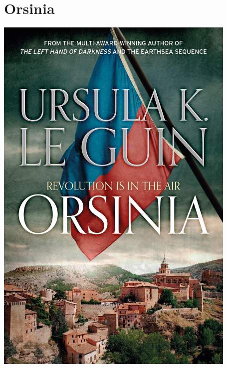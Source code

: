\documentclass{tufte-handout}
\makeatletter
\newcommand{\varcaption}[2][0pt]{%
  \gsetlength{\@tufte@caption@vertical@offset}{-#1}%
  \gdef\@tufte@stored@varcaption{#2}%
}
\gdef\@tufte@stored@varcaption{} %
\makeatother
\begin{document}
\section*{Orsinia}
\begin{marginfigure}[7\baselineskip]
   \includegraphics[width=\linewidth]{images/orsinia.jpg}
   \varcaption{\href{https://www.gollancz.co.uk/titles/ursula-k-le-guin/orsinia/9781473212060/}{Publisher Link}, \href{https://www.amazon.com/Orsinia-Malafrena-Orsinian-Fantasy-Masterworks/dp/1473212065/}{Amazon Link}}
\end{marginfigure}
\end{document}
